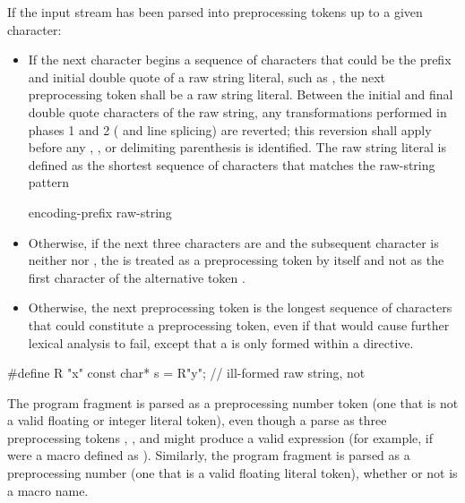 \pnum
If the input stream has been parsed into preprocessing tokens up to a
given character:
\begin{itemize}
%
\item If the next character begins a sequence of characters that could be the prefix
and initial double quote of a raw string literal, such as , the next preprocessing
token shall be a raw string literal. Between the initial and final
double quote characters of the raw string, any transformations performed in phases
1 and 2 ( and line splicing) are reverted; this reversion
shall apply before any , , or delimiting
parenthesis is identified. The raw string literal is defined as the shortest sequence
of characters that matches the raw-string pattern

\begin{ncbnf}
encoding-prefix\opt{}  raw-string
\end{ncbnf}

\item Otherwise, if the next three characters are \tcode{<::} and the subsequent character
is neither \tcode{:} nor \tcode{>}, the \tcode{<} is treated as a preprocessing token by
itself and not as the first character of the alternative token \tcode{<:}.

\item Otherwise,
the next preprocessing token is the longest sequence of
characters that could constitute a preprocessing token, even if that
would cause further lexical analysis to fail,
except that a  is only formed
within a  directive.
\end{itemize}

\begin{example}
\begin{codeblock}
#define R "x"
const char* s = R"y";           // ill-formed raw string, not 
\end{codeblock}
\end{example}

\pnum
\begin{example} The program fragment  is parsed as a
preprocessing number token (one that is not a valid floating or integer
literal token), even though a parse as three preprocessing tokens
, \tcode{+}, and  might produce a valid expression (for example,
if  were a macro defined as ). Similarly, the
program fragment  is parsed as a preprocessing number (one
that is a valid floating literal token), whether or not  is a
macro name. \end{example}


